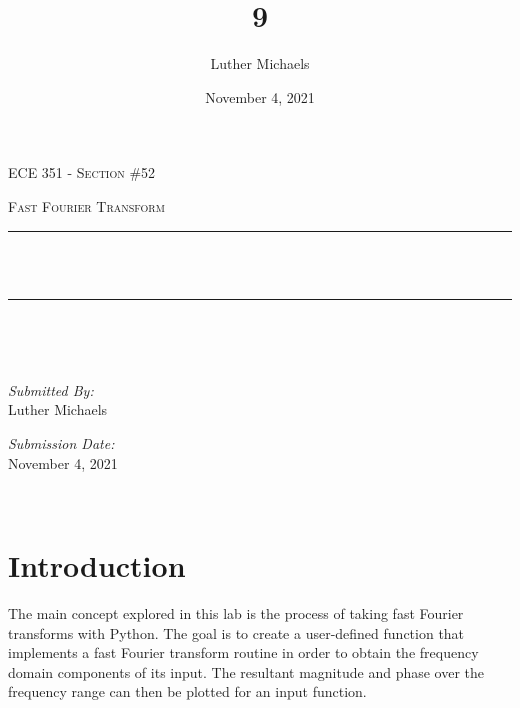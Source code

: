 \documentclass[12pt]{report}
\title{9}	%
\author{Luther Michaels}	%
\date{November 4, 2021}   %
\makeatletter
\let\thetitle\@title
\makeatother
\begin{document}
	
\begin{titlepage}
	\centering
	\vspace*{0.5 cm}
		
	\begin{center}    
		\textsc{\Large   ECE 351 - Section \#52}\\[2.0 cm]	
	\end{center}  
	\textsc{\Large Fast Fourier Transform  }\\[0.5 cm]
	\rule{\linewidth}{0.2 mm} \\[0.4 cm]
	{ \huge \bfseries \thetitle}\\
	\rule{\linewidth}{0.2 mm} \\[1.5 cm]
	\begin{minipage}{0.4\textwidth}
		\begin{flushleft} \large
		\end{flushleft}
	\end{minipage}~
	\begin{minipage}{0.4\textwidth}
		\begin{flushright} \large
			\emph{Submitted By:} \\
			Luther Michaels \break
			
			\emph{Submission Date:} \\
			November 4, 2021
		\end{flushright}
	\end{minipage}\\[2 cm]
\end{titlepage}
	

\tableofcontents
\pagebreak

\renewcommand{\thesection}{\arabic{section}}
\section{Introduction}
		  
The main concept explored in this lab is the process of taking fast Fourier transforms with Python. The goal is to create a user-defined function that implements a fast Fourier transform routine in order to obtain the frequency domain components of its input. The resultant magnitude and phase over the frequency range can then be plotted for an input function. \\
\end{document}
